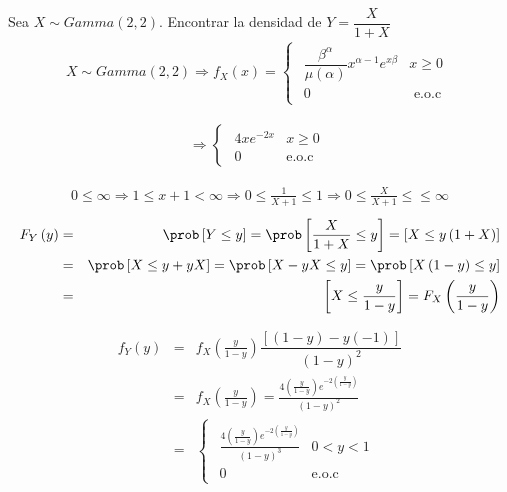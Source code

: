\begin{Ejem}

Sea $X \sim Gamma \left( 2,2 \right)$. Encontrar la densidad de $Y=\dfrac{X}{1+X}$\\ 

\begin{eqnarray*}
X \sim Gamma \left( 2,2 \right) \Rightarrow f_{X}\left( x \right)= 
\begin{cases}
\begin{array}{lc}
\dfrac{\beta^{\alpha}}{\mu\left(\alpha\right)}x^{\alpha -1}e^{x\beta} & x \geq 0 \\
0 & \textrm{ e.o.c}
\end{array}
\end{cases}
\end{eqnarray*}

\begin{eqnarray*}
\Rightarrow
\begin{cases}
\begin{array}{lc}
4xe^{-2x} & x \geq 0 \\
0 & \textrm {e.o.c}
\end{array}
\end{cases}
\end{eqnarray*}

\begin{eqnarray*}
0\leq \infty \Rightarrow 1 \leq x+1 < \infty \Rightarrow 0 \leq \frac{1}{X+1}\leq 1 \Rightarrow 0\leq\frac{X}{X+1}\leq\leq \infty
\end{eqnarray*}
\begin{eqnarray*}
F_{Y}\left(y\right)&=& \prob \left[Y\leq y\right]=\prob \left[\frac{X}{1+X}\leq y\right]= \left[X\leq y\left(1+X\right)\right]\\
&=& \prob\left[X\leq y+yX\right]=\prob\left[X-yX\leq y\right]=\prob\left[X\left(1-y\right)\leq y\right]\\
&=& \left[X\leq \frac{y}{1-y}\right]= F_{X}\left(\dfrac{y}{1-y}\right)
\end{eqnarray*}

\begin{eqnarray*}
f_{Y}\left(y\right)&=&f_{X}\left(\frac{y}{1-y}\right)\dfrac{\left[\left(1-y\right)-y\left(-1\right)\right]}{\left(1-y\right)^{2}}\\  
&=&f_{X}\left(\frac{y}{1-y}\right)=\frac{4\left(\frac{y}{1-y}\right)e^{-2\left(\frac{y}{1-y}\right)}}{\left(1-y\right)^{2}}\\
&=&\begin{cases}
\begin{array}{cc}
\frac{4\left(\frac{y}{1-y}\right)e^{-2\left(\frac{y}{1-y}\right)}}{\left(1-y\right)^{3}} & 0<y<1 \\
0 & \textrm {e.o.c}
\end{array}
\end{cases}
\end{eqnarray*}


\end{Ejem}
